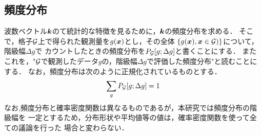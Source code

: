 \subsection{頻度分布}
波数ベクトル$\mbox{\boldmath{$k$}}$のて統計的な特徴を見るために，$\mbox{\boldmath{$k$}}$の頻度分布を求める．
そこで，格子$\cal G$上で得られた観測量を$g(\mbox{\boldmath{$x$}})$とし，その全体
$\left\{ g(\fat{x}), \fat{x}\in {\cal G}) \right\}$について，階級幅$\Delta g$で
カウントしたときの頻度分布を$P_{\cal G} [g;\Delta g]$と書くことにする．
またこれを，"${\cal G}$で観測したデータ$g$の，階級幅$\Delta g$で評価した頻度分布"と読むことにする．
なお，頻度分布は次のように正規化されているものとする．
\begin{equation}
	\sum_{g} P_{\cal G}[g;\Delta g]=1
	\label{eqn:normalize}
\end{equation}
なお,頻度分布と確率密度関数は異なるものであるが，本研究では頻度分布の階級幅を
一定とするため，分布形状や平均値等の値は，確率密度関数を使って全ての議論を行った
場合と変わらない．
